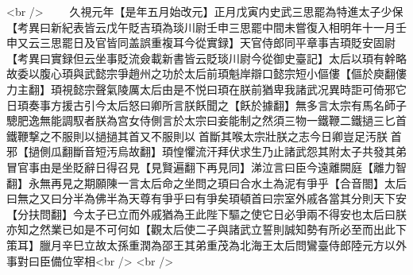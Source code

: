 <br />
　　久視元年【是年五月始改元】正月戊寅内史武三思罷為特進太子少保　【考異曰新紀表皆云戊午貶吉頊為琰川尉壬申三思罷中間未嘗復入相明年十一月壬申又云三思罷日及官皆同盖誤重複耳今從實録】天官侍郎同平章事吉頊貶安固尉　【考異曰實録但云坐事貶流僉載新書皆云貶琰川尉今從御史臺記】太后以頊有幹略故委以腹心頊與武懿宗爭趙州之功於太后前頊魁岸辯口懿宗短小傴僂【傴於庾翻僂力主翻】頊視懿宗聲氣陵厲太后由是不悦曰頊在朕前猶卑我諸武况異時詎可倚邪它日頊奏事方援古引今太后怒曰卿所言朕飫聞之【飫於據翻】無多言太宗有馬名師子驄肥逸無能調馭者朕為宫女侍側言於太宗曰妾能制之然須三物一鐵鞭二鐵撾三匕首鐵鞭撃之不服則以撾撾其首又不服則以首斷其喉太宗壯朕之志今日卿豈足汚朕首邪【撾側瓜翻斷音短汚烏故翻】頊惶懼流汗拜伏求生乃止諸武怨其附太子共發其弟冒官事由是坐貶辭日得召見【見賢遍翻下再見同】涕泣言曰臣今遠離闕庭【離力智翻】永無再見之期願陳一言太后命之坐問之頊曰合水土為泥有爭乎【合音閤】太后曰無之又曰分半為佛半為天尊有爭乎曰有爭矣頊頓首曰宗室外戚各當其分則天下安【分扶問翻】今太子已立而外戚猶為王此陛下驅之使它日必爭兩不得安也太后曰朕亦知之然業已如是不可何如【觀太后使二子與諸武立誓則誠知勢有所必至而出此下策耳】臘月辛巳立故太孫重潤為邵王其弟重茂為北海王太后問鸞臺侍郎陸元方以外事對曰臣備位宰相<br />
<br />
